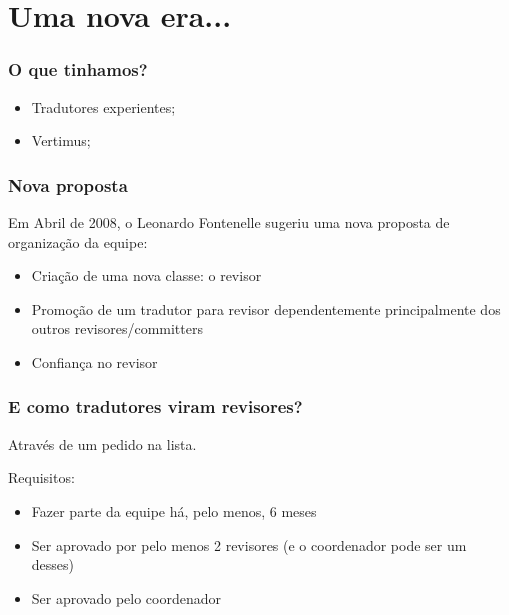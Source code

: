 \documentclass{beamer}
\begin{document}
\section{Uma nova era...}

\begin{frame}
    \frametitle{O que tinhamos?}
    \begin{itemize}[<+->]
        \item Tradutores experientes;
        \item Vertimus;
    \end{itemize}
\end{frame}

\begin{frame}
    \frametitle{Nova proposta}  
    Em Abril de 2008, o Leonardo Fontenelle sugeriu uma nova proposta de organização da equipe:
    \begin{itemize}[<+->]
        \item Criação de uma nova classe: o revisor
        \item Promoção de um tradutor para revisor dependentemente principalmente dos outros revisores/committers
        \item Confiança no revisor
    \end{itemize}
\end{frame}


\begin{frame}
    \frametitle{E como tradutores viram revisores?}
    Através de um pedido na lista.

    Requisitos:
    \begin{itemize}[<+->]
        \item Fazer parte da equipe há, pelo menos, 6 meses
        \item Ser aprovado por pelo menos 2 revisores (e o coordenador pode ser um desses)
        \item Ser aprovado pelo coordenador
    \end{itemize}
\end{frame}
\end{document}

